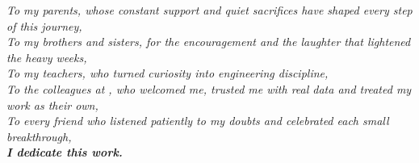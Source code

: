\thispagestyle{empty}
\vspace*{2cm}
\begin{flushright}
\itshape\large
To my parents, whose constant support and quiet sacrifices have shaped every step of this journey,\\[0.6cm]
To my brothers and sisters, for the encouragement and the laughter that lightened the heavy weeks,\\[0.6cm]
To my teachers, who turned curiosity into engineering discipline,\\[0.6cm]
To the colleagues at \hostorg, who welcomed me, trusted me with real data and treated my work as their own,\\[0.6cm]
To every friend who listened patiently to my doubts and celebrated each small breakthrough,\\[0.8cm]
\textbf{I dedicate this work.}
\end{flushright}
\vfill
\cleardoublepage
